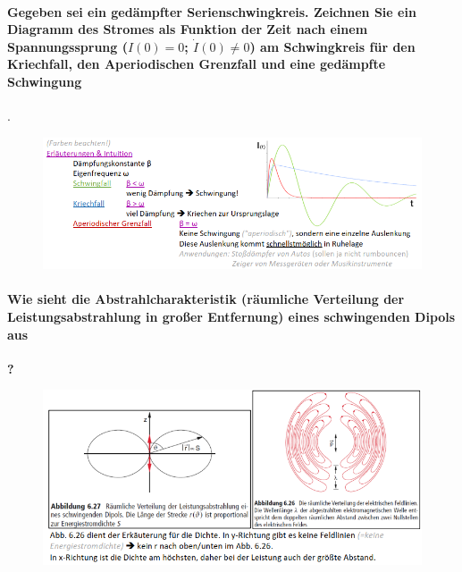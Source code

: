 \documentclass[a4paper, 11pt, parskip=half]{scrartcl}
\begin{document}
\paragraph{Gegeben sei ein gedämpfter Serienschwingkreis. Zeichnen Sie ein Diagramm des Stromes als
Funktion der Zeit nach einem Spannungssprung ($I(0)=0$; $\dot{I}(0)\neq 0$) am Schwingkreis für den
Kriechfall, den Aperiodischen Grenzfall und eine gedämpfte Schwingung}.
\begin{figure}[H]
    \centering
    \includegraphics[width=14cm]{image/12/4.png}
\end{figure}

\paragraph{Wie sieht die Abstrahlcharakteristik (räumliche Verteilung der Leistungsabstrahlung in
großer Entfernung) eines schwingenden Dipols aus}\textbf{?}
\begin{figure}[H]
    \centering
    \includegraphics[width=14cm]{image/12/5.png}
\end{figure}
\end{document}
